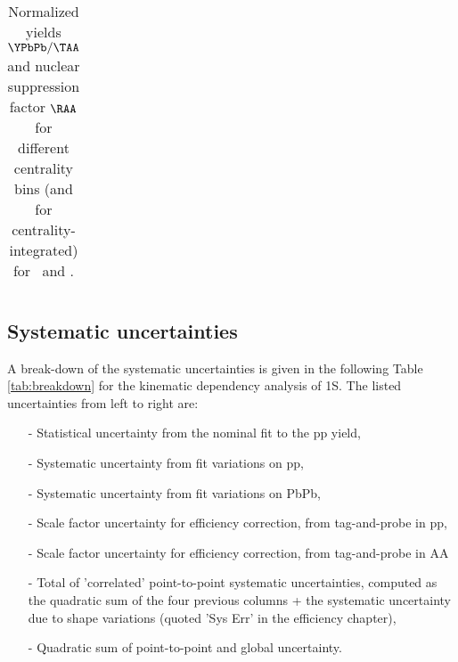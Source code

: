 \begin{table}[hbtp]
\begin{centering}
\begin{tabular}{|c|c|c|}
    \end{tabular}
    \caption{Normalized yields $\YPbPb/\TAA$ and nuclear suppression factor $\RAA$ for different
      centrality bins (and for centrality-integrated) for \PgUa\ and \PgUb.}
    \label{tab:centraa}
  \end{centering}
\end{table}

\subsection{Systematic uncertainties}
A break-down of the systematic uncertainties is given in the following
Table \ref{tab:breakdown} for the kinematic dependency analysis of
1S. The listed uncertainties from left to right
are:
\begin{itemize}
\item[-] Statistical uncertainty from the nominal fit to the
      pp yield,
\item[-] Systematic uncertainty from fit variations on pp,
\item[-] Systematic uncertainty from fit variations on PbPb,
\item[-] Scale factor uncertainty for efficiency correction, from tag-and-probe in
  pp,
\item[-] Scale factor uncertainty for efficiency correction, from tag-and-probe in
  AA
\item[-] Total of 'correlated' point-to-point
  systematic uncertainties, computed as the quadratic sum of the four
  previous columns + the systematic uncertainty due to shape
  variations (quoted 'Sys Err' in the efficiency chapter),
\item[-] Quadratic sum of point-to-point and global uncertainty.
\end{itemize}
\newpage
